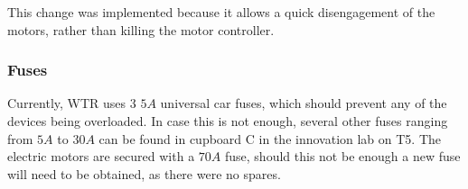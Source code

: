 This change was implemented because it allows a quick disengagement of the motors, rather than killing the motor controller.


\subsubsection{Fuses}
Currently, WTR uses 3 $5A$ universal car fuses, which should prevent any of the devices being overloaded.
In case this is not enough, several other fuses ranging from $5A$ to $30A$ can be found in cupboard C in the innovation lab on T5.
The electric motors are secured with a $70A$ fuse, should this not be enough a new fuse will need to be obtained, as there were no spares.
\newpage
